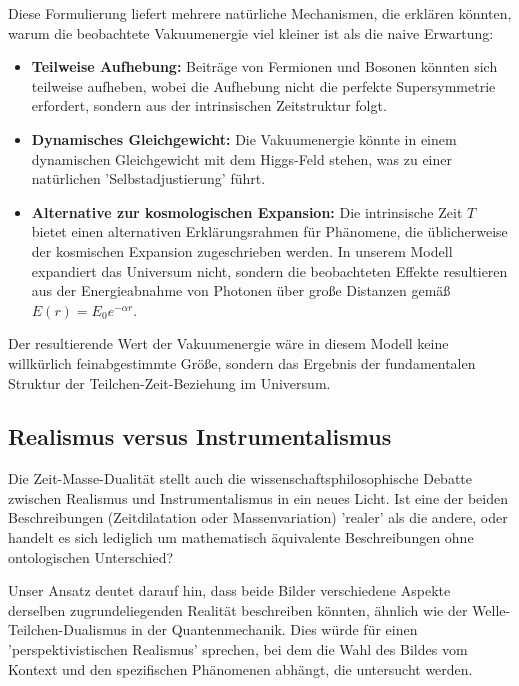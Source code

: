 \documentclass[a4paper,12pt]{article}
\begin{document}
	Diese Formulierung liefert mehrere natürliche Mechanismen, die erklären könnten, warum die beobachtete Vakuumenergie viel kleiner ist als die naive Erwartung:
	
	\begin{itemize}
		\item \textbf{Teilweise Aufhebung:} Beiträge von Fermionen und Bosonen könnten sich teilweise aufheben, wobei die Aufhebung nicht die perfekte Supersymmetrie erfordert, sondern aus der intrinsischen Zeitstruktur folgt.
		
		\item \textbf{Dynamisches Gleichgewicht:} Die Vakuumenergie könnte in einem dynamischen Gleichgewicht mit dem Higgs-Feld stehen, was zu einer natürlichen 'Selbstadjustierung' führt.
		
		\item \textbf{Alternative zur kosmologischen Expansion:} Die intrinsische Zeit $T$ bietet einen alternativen Erklärungsrahmen für Phänomene, die üblicherweise der kosmischen Expansion zugeschrieben werden. In unserem Modell expandiert das Universum nicht, sondern die beobachteten Effekte resultieren aus der Energieabnahme von Photonen über große Distanzen gemäß $E(r) = E_0 e^{-\alpha r}$.
	\end{itemize}
	
	Der resultierende Wert der Vakuumenergie wäre in diesem Modell keine willkürlich feinabgestimmte Größe, sondern das Ergebnis der fundamentalen Struktur der Teilchen-Zeit-Beziehung im Universum.
	
	\subsection{Realismus versus Instrumentalismus}
	
	Die Zeit-Masse-Dualität stellt auch die wissenschaftsphilosophische Debatte zwischen Realismus und Instrumentalismus in ein neues Licht. Ist eine der beiden Beschreibungen (Zeitdilatation oder Massenvariation) 'realer' als die andere, oder handelt es sich lediglich um mathematisch äquivalente Beschreibungen ohne ontologischen Unterschied?
	
	Unser Ansatz deutet darauf hin, dass beide Bilder verschiedene Aspekte derselben zugrundeliegenden Realität beschreiben könnten, ähnlich wie der Welle-Teilchen-Dualismus in der Quantenmechanik. Dies würde für einen 'perspektivistischen Realismus' sprechen, bei dem die Wahl des Bildes vom Kontext und den spezifischen Phänomenen abhängt, die untersucht werden.
	
\end{document}

